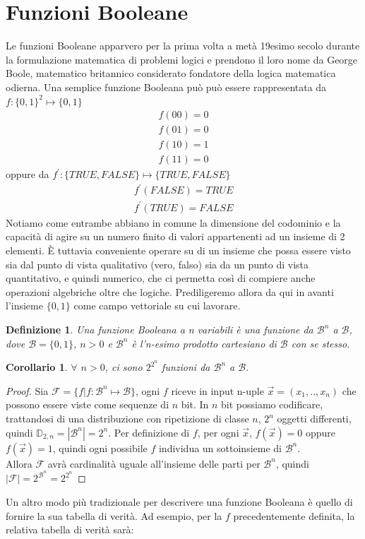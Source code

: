 \documentclass[12pt,a4paper,openright]{report}
\newtheorem{mydef}{Definizione}[chapter]
\newtheorem*{mycor}{Corollario}
\begin{document}
\section{Funzioni Booleane}
Le funzioni Booleane apparvero per la prima volta a metà 19esimo secolo durante la formulazione matematica di problemi logici e prendono
il loro nome da George Boole, matematico britannico considerato fondatore della logica matematica odierna\cite{ref2}.\newpage
Una semplice funzione Booleana può può essere rappresentata da \\$f:\{0,1\}^2 \mapsto \{0,1\}$
\begin{align*}  
    f(00) = 0 \\
    f(01) = 0 \\
    f(10) = 1 \\
    f(11) = 0
\end{align*}
oppure da $f^\prime:\{TRUE,FALSE\}\mapsto{\{TRUE,FALSE\}}$
\begin{align*}
    f^\prime(FALSE) = TRUE \\
    f^\prime(TRUE) = FALSE 
\end{align*}
Notiamo come entrambe abbiano in comune la dimensione del codominio e la capacità di agire su un numero finito di valori appartenenti ad un insieme di 2 elementi.
È tuttavia conveniente operare su di un insieme che possa essere visto sia dal punto di vista qualitativo (vero, falso)
sia da un punto di vista quantitativo, e quindi numerico, che ci permetta così di compiere anche operazioni algebriche oltre che logiche. Prediligeremo allora da qui in avanti l'insieme
$\{0,1\}$ come campo vettoriale su cui lavorare.
\par
\begin{mydef}
    Una \textnormal{funzione Booleana a \textit{n} variabili} è una funzione da $\mathcal{B}^n$ a $\mathcal{B}$,
    dove $\mathcal{B} = \{0,1\}$, $n > 0$ e $\mathcal{B}^n$ è l'n-esimo prodotto cartesiano di $\mathcal{B}$ con se stesso.\cite{ref3}
\end{mydef}
\begin{mycor}
    $\forall$ $n > 0$, ci sono $2^{2^{n}}$ funzioni da $\mathcal{B}^n$ a $\mathcal{B}.$
\end{mycor}
\begin{proof}
    Sia $\mathcal{F}=\{f|f:\mathcal{B}^n\mapsto{\mathcal{B}}\}$,
    ogni $f$ riceve in input n-uple $\vec{x}=(x_1,..,x_n)$ che possono essere viste come sequenze di $n$ bit.
    In $n$ bit possiamo codificare, trattandosi di una distribuzione con ripetizione di classe $n$, $2^n$ oggetti differenti, quindi $\mathbb{D}_{2,n}=\left\vert{\mathcal{B}^n}\right\vert = 2^n$.
    Per definizione di $f$, per ogni $\vec{x}$, $f(\vec{x}) = 0$  oppure  $f(\vec{x}) = 1$, quindi ogni possibile $f$ individua un sottoinsieme di $\mathcal{B}^n$.\\
    Allora $\mathcal{F}$ avrà cardinalità uguale all'insieme delle parti per $\mathcal{B}^n$, quindi  $\left\vert{\mathcal{F}}\right\vert = 2^{\mathcal{B}^n}=2^{2^{n}}$

\end{proof}
Un altro modo più tradizionale per descrivere una funzione Booleana è quello di fornire la sua tabella di verità.
Ad esempio, per la $f$ precedentemente definita, la relativa tabella di verità sarà:
\end{document}
